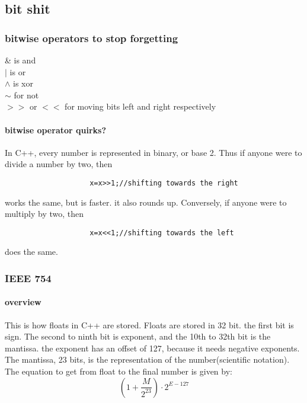 \documentclass{article} %
\begin{document}
    \subsection{bit shit}
        \subsubsection{bitwise operators to stop forgetting}
            \begin{center}
                \& is and\\$|$ is or\\$\wedge$ is xor\\$\sim$ for not\\$>>$ or $<<$ for moving bits left and right respectively
            \end{center}
            \paragraph{bitwise operator quirks?}
                In C++, every number is represented in binary, or base 2. Thus if anyone were to divide a number by two, then
                \begin{verbatim}
                    x=x>>1;//shifting towards the right
                \end{verbatim}
                works the same, but is faster. it also rounds up. Conversely, if anyone were to multiply by two, then 
                \begin{verbatim}
                    x=x<<1;//shifting towards the left
                \end{verbatim}
                does the same.
        \subsubsection{IEEE 754}
            \paragraph{overview}
                This is how floats in C++ are stored. Floats are stored in 32 bit. the first bit is sign.
                The second to ninth bit is exponent, and the 10th to 32th bit is the mantissa. the exponent has
                an offset of 127, because it needs negative exponents. The mantissa, 23 bits, is the representation of the number(scientific notation).
                The equation to get from float to the final number is given by:
                \begin{equation}
                    (1+\dfrac{M}{2^{23}})\cdot2^{E-127}
                \end{equation}
\end{document}
